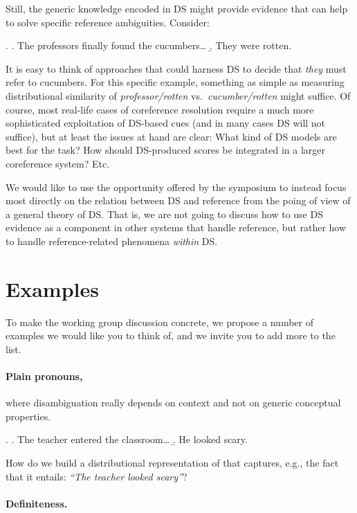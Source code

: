 \documentclass[a4paper,12pt]{article}
\begin{document}
Still, the generic knowledge encoded in DS might provide evidence that
can help to solve specific reference ambiguities. Consider:

\ex. \a. The professors finally found the cucumbers\ldots
\b. They were rotten.

It is easy to think of approaches that could harness DS to decide that
\emph{they} must refer to cucumbers. For this specific example,
something as simple as measuring distributional similarity of
\emph{professor/rotten} vs.~\emph{cucumber/rotten} might suffice. Of
course, most real-life cases of coreference resolution require a much
more sophisticated exploitation of DS-based cues (and in many cases DS
will not suffice), but at least the issues at hand are clear: What
kind of DS models are best for the task? How should DS-produced scores
be integrated in a larger coreference system? Etc.

We would like to use the opportunity offered by the symposium to
instead focus most directly on the relation between DS and reference
from the poing of view of a general theory of DS. That is, we are not
going to discuss how to use DS evidence as a component in other
systems that handle reference, but rather how to handle
reference-related phenomena \emph{within} DS.

\section{Examples}
\label{sec:examples}

To make the working group discussion concrete, we propose a number of
examples we would like you to think of, and we invite you to add more
to the list.

\paragraph{Plain pronouns,} where disambiguation really depends on
context and not on generic conceptual properties.

\ex. \a. The teacher entered the classroom\ldots 
\b. He looked scary.

How do we build a distributional representation of \Last[b] that
captures, e.g., the fact that it entails: \emph{``The teacher looked
  scary''}?

\paragraph{Definiteness.}
\end{document}
